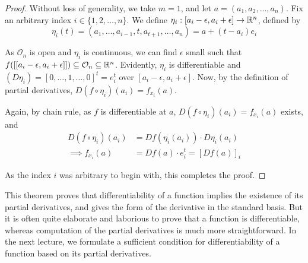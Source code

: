 \documentclass[../Analysis-3.tex]{subfiles}
\begin{document}
\begin{proof}
  Without loss of generality, we take $m = 1$, and let $a = (a_1, a_2, \dots, a_n)$. Fix an arbitrary index $i \in \{1,2,\dots,n \}$. We define $\eta_i : [a_i - \epsilon,a_i + \epsilon] \to \mathbb{R}^n$, defined by
  \[\eta_i(t) = (a_1, \dots, a_{i-1}, t, a_{t+1}, \dots, a_n) = a + (t-a_i)e_i \]

  As $\mathcal{O}_n$ is open and $\eta_i$ is continuous, we can find $\epsilon$ small such that $f([[a_i - \epsilon,a_i + \epsilon]]) \subseteq \mathcal{O}_n \subseteq \mathbb{R}^n$. Evidently, $\eta_i$ is differentiable and $(D\eta_i) = [0,\dots,1,\dots,0]^t = e_i^t$ over $[a_i - \epsilon,a_i + \epsilon]$. Now, by the definition of partial derivatives, \(D(f\circ\eta_i)(a_i) = f_{x_i} (a)\).

  Again, by chain rule, as $f$ is differentiable at $a$, $D(f\circ\eta_i)(a_i) = f_{x_i}(a)$ exists, and
  \begin{align*}
    D(f\circ\eta_i)(a_i) & = Df(\eta_i(a_i)) \cdot D\eta_i (a_i) \\
    \implies f_{x_i} (a) & = Df(a) \cdot e_i^t = [Df(a)]_i
  \end{align*}

  As the index $i$ was arbitrary to begin with, this completes the proof.
\end{proof}

This theorem proves that differentiability of a function implies the existence of its partial derivatives, and gives the form of the derivative in the standard basis. But it is often quite elaborate and laborious to prove that a function is differentiable, whereas computation of the partial derivatives is much more straightforward. In the next lecture, we formulate a sufficient condition for differentiability of a function based on its partial derivatives.
\end{document}
